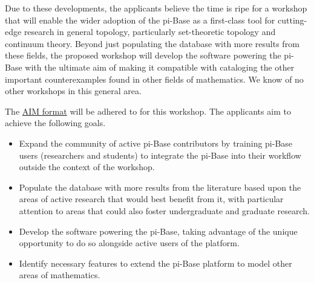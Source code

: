 \documentclass{amsart}
\newcommand{\TODO}[1]{\textcolor{red}{(TODO: #1)}}
\begin{document}
Due to these developments, the applicants believe the time is ripe
for a workshop that will enable the wider adoption of the
pi-Base as a first-class tool for cutting-edge research in
general topology, particularly set-theoretic topology and continuum
theory. Beyond just populating the database with more results from
these fields, the proposed workshop will develop the software powering
the pi-Base with the ultimate aim of making it compatible with cataloging
the other important counterexamples found in other fields of mathematics.
We know of no other workshops in this general area.


The \href{https://www.aimath.org/research/aimstyle.html}{AIM format}
will be adhered to for this workshop. The applicants aim to achieve
the following goals.

\begin{itemize}
    \item Expand the community of active pi-Base contributors by training
    pi-Base users (researchers and students) to integrate the pi-Base
    into their workflow outside the context of the workshop.
    \item Populate the database with more results from the literature
    based upon the areas of active research that would best benefit
    from it, with particular attention to areas that could also foster
    undergraduate and graduate research.
    \item Develop the software powering the pi-Base, taking advantage
    of the unique opportunity to do so alongside active users of
    the platform.
    \item Identify necessary features to extend the pi-Base platform
    to model other areas of mathematics.
\end{itemize}


\end{document}
